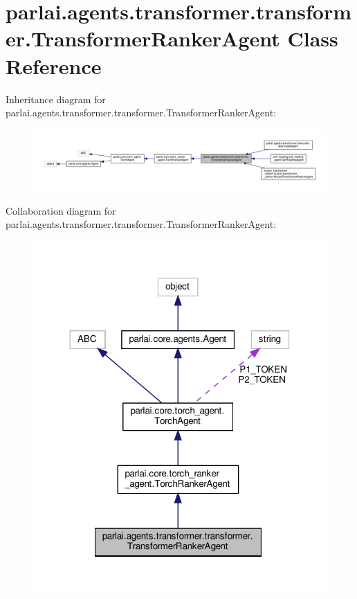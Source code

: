 \hypertarget{classparlai_1_1agents_1_1transformer_1_1transformer_1_1TransformerRankerAgent}{}\section{parlai.\+agents.\+transformer.\+transformer.\+Transformer\+Ranker\+Agent Class Reference}
\label{classparlai_1_1agents_1_1transformer_1_1transformer_1_1TransformerRankerAgent}


Inheritance diagram for parlai.\+agents.\+transformer.\+transformer.\+Transformer\+Ranker\+Agent\+:
\nopagebreak
\begin{figure}[H]
\begin{center}
\leavevmode
\includegraphics[width=350pt]{classparlai_1_1agents_1_1transformer_1_1transformer_1_1TransformerRankerAgent__inherit__graph}
\end{center}
\end{figure}


Collaboration diagram for parlai.\+agents.\+transformer.\+transformer.\+Transformer\+Ranker\+Agent\+:
\nopagebreak
\begin{figure}[H]
\begin{center}
\leavevmode
\includegraphics[width=318pt]{classparlai_1_1agents_1_1transformer_1_1transformer_1_1TransformerRankerAgent__coll__graph}
\end{center}
\end{figure}
